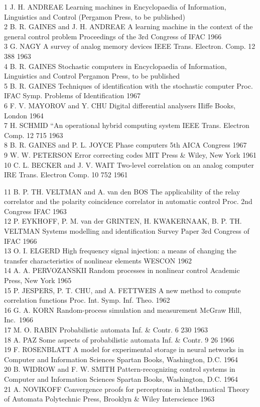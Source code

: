 \documentclass[
  10
]{article}
\begin{document}
1 J. H. ANDREAE Learning machines in Encyclopaedia of Information,
Linguistics and Control (Pergamon Press, to be published)\\
2 B. R. GAINES and J. H. ANDREAE A learning machine in the context of
the general control problem Proceedings of the 3rd Congress of IFAC
1966\\
3 G. NAGY A survey of analog memory devices IEEE Trans. Electron. Comp.
12 388 1963\\
4 B. R. GAINES Stochastic computers in Encyclopaedia of Information,
Linguistics and Control Pergamon Press, to be published\\
5 B. R. GAINES Techniques of identification with the stochastic computer
Proc. IFAC Symp. Problems of Identification 1967\\
6 F. V. MAYOROV and Y. CHU Digital differential analysers IIiffe Books,
London 1964\\
7 H. SCHMID ``An operational hybrid computing system IEEE Trans.
Electron Comp. 12 715 1963\\
8 B. R. GAINES and P. L. JOYCE Phase computers 5th AICA Congress 1967\\
9 W. W. PETERSON Error correcting codes MIT Press \& Wiley, New York
1961\\
10 C. L. BECKER and J. V. WAIT Two-level correlation on an analog
computer IRE Trans. Electron Comp. 10 752 1961

11 B. P. TH. VELTMAN and A. van den BOS The applicability of the relay
correlator and the polarity coincidence correlator in automatic control
Proc. 2nd Congress IFAC 1963\\
12 P. EYKHOFF, P. M. van der GRINTEN, H. KWAKERNAAK, B. P. TH. VELTMAN
Systems modelling and identification Survey Paper 3rd Congress of IFAC
1966\\
13 O. I. ELGERD High frequency signal injection: a means of changing the
transfer characteristics of nonlinear elements WESCON 1962\\
14 A. A. PERVOZANSKII Random processes in nonlinear control Academic
Press, New York 1965\\
15 P. JESPERS, P. T. CHU, and A. FETTWEIS A new method to compute
correlation functions Proc. Int. Symp. Inf. Theo. 1962\\
16 G. A. KORN Random-process simulation and measurement McGraw Hill,
Inc.~1966\\
17 M. O. RABIN Probabilistic automata Inf. \& Contr. 6 230 1963\\
18 A. PAZ Some aspects of probabilistic automata Inf. \& Contr. 9 26
1966\\
19 F. ROSENBLATT A model for experimental storage in neural networks in
Computer and Information Sciences Spartan Books, Washington, D.C. 1964\\
20 B. WIDROW and F. W. SMITH Pattern-recognizing control systems in
Computer and Information Sciences Spartan Books, Washington, D.C. 1964\\
21 A. NOVIKOFF Convergence proofs for perceptrons in Mathematical Theory
of Automata Polytechnic Press, Brooklyn \& Wiley Interscience 1963
\end{document}
